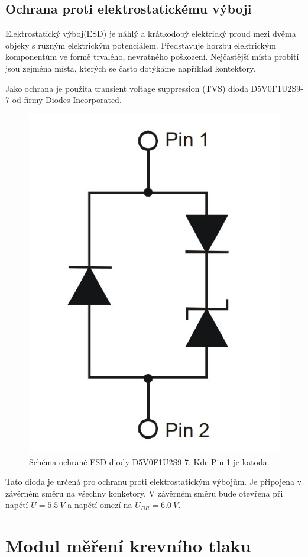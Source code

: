 \subsection{Ochrana proti elektrostatickému výboji}
Elektrostatický výboj(ESD) je náhlý a krátkodobý elektrický proud mezi dvěma objeky s různým elektrickým potenciálem. Představuje horzbu elektrickým komponentům ve formě trvalého, nevratného poškození. Nejčastější místa probití jsou zejména místa, kterých se často dotýkáme například kontektory.
\par
Jako ochrana je použita transient voltage suppression (TVS) dioda D5V0F1U2S9-7 od firmy Diodes Incorporated.

\begin{figure}[H]
    \centering
    \includegraphics[width=0.4\linewidth]{pictures/esd_diode_schema.jpg}
    \caption{Schéma ochrané ESD diody D5V0F1U2S9-7. Kde Pin 1 je katoda.}
    \label{fig:esd_diode}
\end{figure}

Tato dioda je určená pro ochranu proti elektrostatickým výbojům. Je připojena v závěrném směru na všechny konketory. V závěrném směru bude otevřena při napětí
$U = 5.5 \ V $ a napětí omezí na $U_{BR} = 6.0 \ V $.

\section{Modul měření krevního tlaku}

